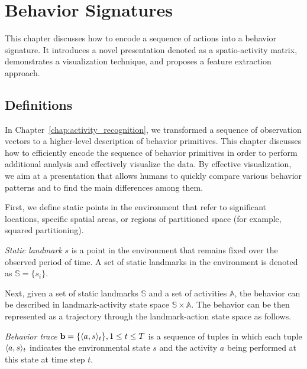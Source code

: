 
%
%
\chapter{Behavior Signatures}
\label{chap:signatures}

This chapter discusses how to encode a sequence of actions into a behavior signature. It introduces a novel presentation denoted as a spatio-activity matrix, demonstrates a  visualization technique, and proposes a feature extraction approach.

%
%
\section{Definitions}
In Chapter~\ref{chap:activity_recognition}, we transformed a sequence of observation vectors to a higher-level description of behavior primitives. This chapter discusses how to efficiently encode the sequence of behavior primitives in order to perform additional analysis and effectively visualize the data. By effective visualization, we aim at a presentation that allows humans to quickly compare various behavior patterns and to find the main differences among them.

First, we define static points in the environment that refer to significant locations, specific spatial areas, or regions of partitioned space (for example, squared partitioning).
\begin{definition}
\label{def:landmark}
	\emph{Static landmark} $s$ is a point in the environment that remains fixed over the observed period of time. A set of static landmarks in the environment is denoted as $\mathbb{S}=\{s_i\}$.
\end{definition}
\noindent 

Next, given a set of static landmarks $\mathbb{S}$ and a set of activities $\mathbb{A}$, the behavior can be described in landmark-activity state space $\mathbb{S} \times \mathbb{A}$.
The behavior can be then represented as a trajectory through the landmark-action state space as follows. 

\begin{definition}
\label{def:behavior_trace}
	\emph{Behavior trace} $\mathbf{b}=\{\langle a, s \rangle_t\}, 1 \leq t \leq T$ is a sequence of tuples in which each tuple $\langle a,s \rangle_t$ indicates the environmental state $s$ and the activity $a$ being performed at this state at time step $t$.
\end{definition}




